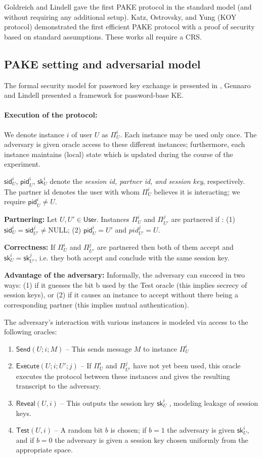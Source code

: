 \documentclass[11pt]{article}
\newcommand{\class}[1]{{\ensuremath{\mathsf{#1}}}}
\newcommand{\sid}{\class{sid}}
\newcommand{\pid}{\class{pid}}
\newcommand{\sk}{\class{sk}}
\newcommand{\iU}{\ensuremath{\Pi^i_U}}
\newcommand{\jU}{\ensuremath{\Pi^j_{U'}}}
\begin{document}
Goldreich and Lindell \cite{GoldreichL06} gave the first PAKE protocol in the standard model (and without requiring any additional setup). Katz, Ostrovsky, and Yung (KOY protocol) demonstrated the first efficient PAKE protocol with a proof of security based on standard assumptions. These works all require a CRS.


\subsection{PAKE setting and adversarial model}
The formal security model for password key exchange is presented in \cite{DBLP:conf/eurocrypt/BellarePR00}, Gennaro and Lindell presented a framework for password-base KE.

\paragraph{Execution of the protocol:} We denote instance $i$ of user $U$ as $\Pi^i_U$. Each instance may be used only once. The adversary is given oracle access to these different instances; furthermore,
each instance maintains (local) state which is updated during the course of the experiment.

$\sid^i_U$, $\pid^i_U$, $\sk^i_U$ denote the \emph{session id, partner id, and session key}, respectively. The partner id denotes the user with whom $\Pi^i_U$ believes it is interacting; we require $\pid^i_U \ne U$.

\textbf{Partnering: }Let $U, U' \in \class{User}$. Instances $\Pi^i_U$ and $\Pi^j_{U'}$ are partnered if : (1) $\sid^i_U = \sid^j_{U'} \ne \text{NULL}$; (2) $\pid^i_U = U'$ and $pid^j_{U'} = U$.

\textbf{Correctness: }If $\Pi^i_U$ and $\Pi^j_{U'}$ are partnered then both of them accept and $\sk^i_U = \sk^j_{U'}$, i.e. they both accept and conclude with the same session key.

\textbf{Advantage of the adversary: }Informally, the adversary can succeed in two ways: (1) if it guesses
the bit b used by the Test oracle (this implies secrecy of session keys), or (2) if it causes an instance to accept without there being a corresponding partner (this implies mutual authentication). 

The adversary's interaction with various instances is modeled via access to the following oracles:
\begin{enumerate}
\item $\class{Send}(U; i; M)$ -- This sends message $M$ to instance $\Pi^i_U$
\item $\class{Execute}(U; i; U'; j)$ -- If $\iU$ and $\jU$ have not yet been used, this oracle executes the protocol between these instances and gives the resulting transcript to the adversary.
\item $\class{Reveal}(U, i)$ -- This outputs the session key $\sk^i_U$ , modeling leakage of session keys.
\item $\class{Test}(U, i)$ -- A random bit $b$ is chosen; if $b = 1$ the adversary is given $\sk^i_U$, and if $b = 0$ the adversary is given a session key chosen uniformly from the appropriate space.
\end{enumerate}
\end{document}
